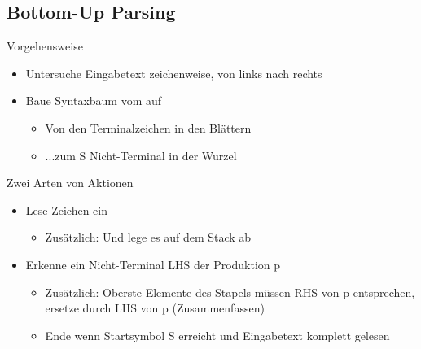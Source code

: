 \subsection{Bottom-Up Parsing}
Vorgehensweise
\begin{itemize}
    \item Untersuche Eingabetext zeichenweise, von links nach rechts
    \item Baue Syntaxbaum vom  auf
    \begin{itemize}
        \item Von den Terminalzeichen in den Blättern
        \item ...zum S Nicht-Terminal in der Wurzel
    \end{itemize}
\end{itemize}
Zwei Arten von Aktionen
\begin{itemize}
    \item {} Lese Zeichen ein
    \begin{itemize}
        \item Zusätzlich: Und lege es auf dem Stack ab
    \end{itemize}
    \item {} Erkenne ein Nicht-Terminal LHS der Produktion p
    \begin{itemize}
        \item Zusätzlich: Oberste Elemente des Stapels müssen RHS von p entsprechen, ersetze durch LHS von p (Zusammenfassen)
        \item Ende wenn Startsymbol S erreicht und Eingabetext komplett gelesen
    \end{itemize}
\end{itemize}

